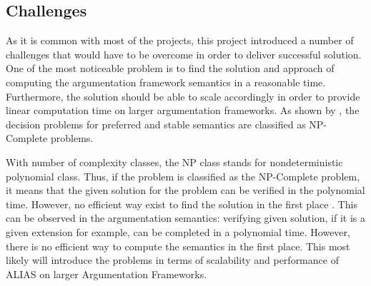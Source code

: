\subsection{Challenges}
As it is common with most of the projects, this project introduced a number of challenges that would have to be overcome in order to deliver successful solution. One of the most noticeable problem is to find the solution and approach of computing the argumentation framework semantics in a reasonable time. Furthermore, the solution should be able to scale accordingly in order to provide linear computation time on larger argumentation frameworks. As shown by \citet{complexity}, the decision problems for preferred and stable semantics are classified as NP-Complete problems. 

With number of complexity classes, the NP class stands for nondeterministic polynomial class. Thus, if the problem is classified as the NP-Complete problem, it means that the given solution for the problem can be verified in the polynomial time. However, no efficient way exist to find the solution in the first place \citep{arora2009computational}. This can be observed in the argumentation semantics: verifying given solution, if it is a given extension for example, can be completed in a polynomial time. However, there is no efficient way to compute the semantics in the first place. This most likely will introduce the problems in terms of scalability and performance of ALIAS on larger Argumentation Frameworks. 